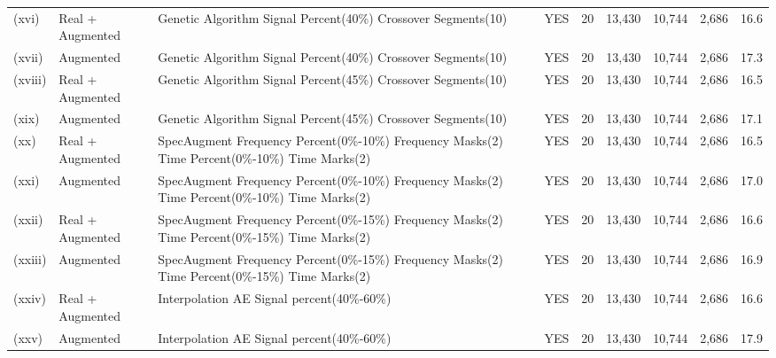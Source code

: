 \documentclass[journal]{IEEEtran}
\begin{document}
\begin{table}
\begin{adjustbox}{width=\textwidth}
\begin{tabular}{lllcrrrrr}
(xvi) & Real + Augmented & Genetic Algorithm
  Signal Percent(40\%) Crossover Segments(10) & YES & 20 & 13,430 & 10,744 & 2,686 & 16.6 \\
(xvii) & Augmented & Genetic Algorithm Signal Percent(40\%) Crossover
  Segments(10) & YES & 20 & 13,430 & 10,744 & 2,686 & 17.3 \\
(xviii) & Real + Augmented & Genetic Algorithm
  Signal Percent(45\%) Crossover Segments(10) & YES & 20 & 13,430 & 10,744 & 2,686 & 16.5 \\
(xix) & Augmented & Genetic Algorithm Signal Percent(45\%) Crossover
  Segments(10) & YES & 20 & 13,430 & 10,744 & 2,686 & 17.1 \\
(xx) & Real + Augmented & SpecAugment
  Frequency Percent(0\%-10\%) Frequency Masks(2) Time Percent(0\%-10\%) Time
  Marks(2) & YES & 20 & 13,430 & 10,744 & 2,686 & 16.5 \\
(xxi) & Augmented & SpecAugment Frequency Percent(0\%-10\%) Frequency
  Masks(2) Time Percent(0\%-10\%) Time Marks(2) & YES & 20 & 13,430 & 10,744 & 2,686 & 17.0 \\
(xxii) & Real + Augmented & SpecAugment
  Frequency Percent(0\%-15\%) Frequency Masks(2) Time Percent(0\%-15\%) Time Marks(2) & YES & 20 & 13,430 & 10,744 & 2,686 & 16.6 \\
(xxiii) & Augmented & SpecAugment Frequency Percent(0\%-15\%) Frequency
  Masks(2) Time Percent(0\%-15\%) Time Marks(2) & YES & 20 & 13,430 & 10,744 & 2,686 & 16.9 \\
(xxiv) & Real + Augmented & Interpolation AE Signal percent(40\%-60\%) & YES & 20 & 13,430 & 10,744 & 2,686 & 16.6 \\
(xxv) & Augmented & Interpolation
  AE Signal percent(40\%-60\%) & YES & 20 & 13,430 & 10,744 & 2,686 & 17.9 \\
\hline %
\end{tabular}
\end{adjustbox}
\label{table:training_statistic}
\end{table}
\end{document}
